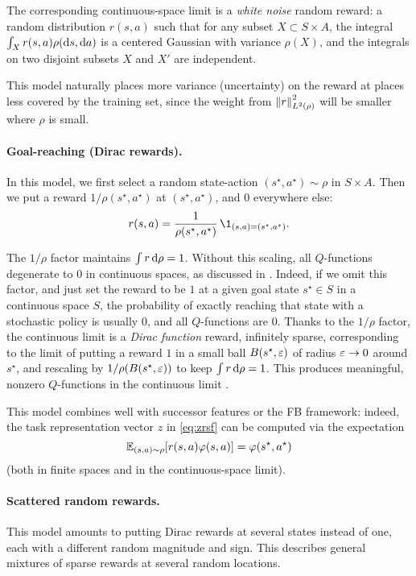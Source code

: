 \documentclass[11pt,a4paper]{article}
\begin{document}
The corresponding continuous-space limit is a \emph{white noise} random
reward: a random distribution $r(s,a)$ such that for any subset $X\subset
S\times A$,
the integral $\int_X r(s,a) \rho(\operatorname{d}\!{} s,\operatorname{d}\!{} a)$ is a centered Gaussian with
variance $\rho(X)$, and the integrals on two disjoint subsets $X$ and
$X'$ are independent.

This model naturally places more variance (uncertainty) on the reward at
places less covered by the training set, since the weight from
$\left\lVert r\right\rVert^2_{L^2(\rho)}$ will be smaller where $\rho$ is small.

\paragraph{Goal-reaching (Dirac rewards).}  In this model, we first
select a random state-action $(s^\star,a^\star)\sim \rho$ in $S\times A$. Then we put
a reward $1/\rho(s^\star,a^\star)$ at $(s^\star,a^\star)$, and $0$
everywhere else:
\begin{equation}
r(s,a)=\frac{1}{\rho(s^\star,a^\star)} \,\1_{(s,a)=(s^\star,a^\star)}.
\end{equation}

The $1/\rho$ factor maintains $\int r\operatorname{d}\!{} \rho=1$. Without this scaling,
all $Q$-functions degenerate to $0$ in continuous spaces, 
as discussed in
\cite{blier2021unbiased}. Indeed, if we omit this factor, and just set the reward to be $1$ at
a given goal state $s^\star\in S$ in a continuous space $S$, the probability of
exactly reaching that state with a stochastic policy is usually $0$, and all
$Q$-functions are $0$. Thanks to the $1/\rho$ factor, the
continuous limit is a \emph{Dirac function} reward, infinitely sparse,
corresponding to the limit of putting a reward $1$ in a small ball
$B(s^\star,\varepsilon)$ of radius $\varepsilon\to 0$ around $s^\star$, and rescaling by
$1/\rho(B(s^\star,\varepsilon))$ to keep $\int r\operatorname{d}\!{} \rho=1$. This produces meaningful,
nonzero $Q$-functions in the continuous limit \cite{blier2021unbiased}.

This model combines well with successor features or the FB framework:
indeed, the task representation vector $z$ in \eqref{eq:zrsf} can be computed via the
expectation 
\begin{equation}
\mathbb{E}_{(s,a)\sim \rho} [r(s,a)\varphi(s,a)]=\varphi(s^\star,a^\star)
\end{equation}
(both in finite spaces and in the continuous-space limit).

\paragraph{Scattered random rewards.} This model amounts to putting Dirac
rewards at several states instead of one, each with a different random
magnitude and sign. This describes general mixtures of sparse rewards at
several random locations.
\end{document}
